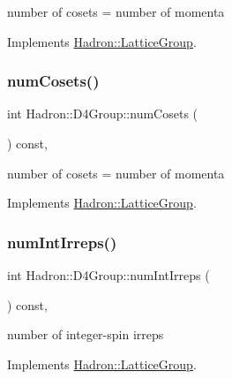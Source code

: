 number of cosets = number of momenta 

Implements \mbox{\hyperlink{structHadron_1_1LatticeGroup_afc76430f36a3a041f86d4058c59bf55e}{Hadron\+::\+Lattice\+Group}}.

\mbox{\label{structHadron_1_1D4Group_a97eed87299880400afc5e9bb1ee222bc}} 
\subsubsection{\texorpdfstring{numCosets()}{numCosets()}\hspace{0.1cm}{\footnotesize\ttfamily [2/2]}}
{\footnotesize\ttfamily int Hadron\+::\+D4\+Group\+::num\+Cosets (\begin{DoxyParamCaption}{ }\end{DoxyParamCaption}) const\hspace{0.3cm}{\ttfamily [inline]}, {\ttfamily [virtual]}}

number of cosets = number of momenta 

Implements \mbox{\hyperlink{structHadron_1_1LatticeGroup_afc76430f36a3a041f86d4058c59bf55e}{Hadron\+::\+Lattice\+Group}}.

\mbox{\label{structHadron_1_1D4Group_a814de4e3ea523397868aee44d639c5cf}} 
\subsubsection{\texorpdfstring{numIntIrreps()}{numIntIrreps()}\hspace{0.1cm}{\footnotesize\ttfamily [1/2]}}
{\footnotesize\ttfamily int Hadron\+::\+D4\+Group\+::num\+Int\+Irreps (\begin{DoxyParamCaption}{ }\end{DoxyParamCaption}) const\hspace{0.3cm}{\ttfamily [inline]}, {\ttfamily [virtual]}}

number of integer-\/spin irreps 

Implements \mbox{\hyperlink{structHadron_1_1LatticeGroup_af2aa7b39222bf188389356eefcef7547}{Hadron\+::\+Lattice\+Group}}.

\mbox{\label{structHadron_1_1D4Group_a814de4e3ea523397868aee44d639c5cf}} 
